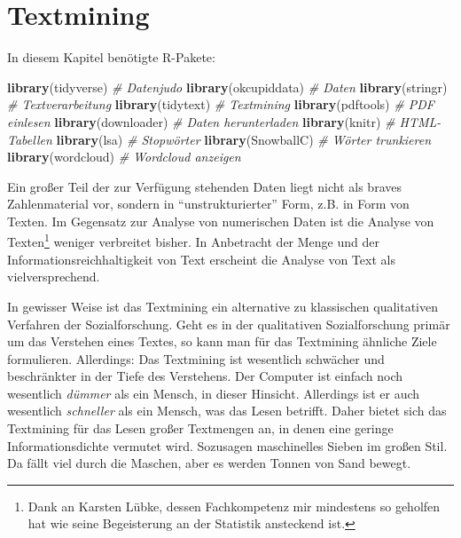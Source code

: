 \documentclass[12pt,]{book}
\newenvironment{Shaded}{\begin{snugshade}}{\end{snugshade}}
\newcommand{\KeywordTok}[1]{\textcolor[rgb]{0.13,0.29,0.53}{\textbf{{#1}}}}
\newcommand{\CommentTok}[1]{\textcolor[rgb]{0.56,0.35,0.01}{\textit{{#1}}}}
\newcommand{\NormalTok}[1]{{#1}}
\let\rmarkdownfootnote\footnote%
\def\footnote{\protect\rmarkdownfootnote}
\begin{document}
\chapter{Textmining}\label{textmining}

In diesem Kapitel benötigte R-Pakete:

\begin{Shaded}
\begin{Highlighting}[]
\KeywordTok{library}\NormalTok{(tidyverse)  }\CommentTok{# Datenjudo}
\KeywordTok{library}\NormalTok{(okcupiddata)  }\CommentTok{# Daten}
\KeywordTok{library}\NormalTok{(stringr)  }\CommentTok{# Textverarbeitung}
\KeywordTok{library}\NormalTok{(tidytext)  }\CommentTok{# Textmining}
\KeywordTok{library}\NormalTok{(pdftools)  }\CommentTok{# PDF einlesen}
\KeywordTok{library}\NormalTok{(downloader)  }\CommentTok{# Daten herunterladen}
\KeywordTok{library}\NormalTok{(knitr)  }\CommentTok{# HTML-Tabellen}
\KeywordTok{library}\NormalTok{(lsa)  }\CommentTok{# Stopwörter }
\KeywordTok{library}\NormalTok{(SnowballC)  }\CommentTok{# Wörter trunkieren}
\KeywordTok{library}\NormalTok{(wordcloud)  }\CommentTok{# Wordcloud anzeigen}
\end{Highlighting}
\end{Shaded}

Ein großer Teil der zur Verfügung stehenden Daten liegt nicht als braves
Zahlenmaterial vor, sondern in ``unstrukturierter'' Form, z.B. in Form
von Texten. Im Gegensatz zur Analyse von numerischen Daten ist die
Analyse von Texten\footnote{Dank an Karsten Lübke, dessen Fachkompetenz
  mir mindestens so geholfen hat wie seine Begeisterung an der Statistik
  ansteckend ist.} weniger verbreitet bisher. In Anbetracht der Menge
und der Informationsreichhaltigkeit von Text erscheint die Analyse von
Text als vielversprechend.

In gewisser Weise ist das Textmining ein alternative zu klassischen
qualitativen Verfahren der Sozialforschung. Geht es in der qualitativen
Sozialforschung primär um das Verstehen eines Textes, so kann man für
das Textmining ähnliche Ziele formulieren. Allerdings: Das Textmining
ist wesentlich schwächer und beschränkter in der Tiefe des Verstehens.
Der Computer ist einfach noch wesentlich \emph{dümmer} als ein Mensch,
in dieser Hinsicht. Allerdings ist er auch wesentlich \emph{schneller}
als ein Mensch, was das Lesen betrifft. Daher bietet sich das Textmining
für das Lesen großer Textmengen an, in denen eine geringe
Informationsdichte vermutet wird. Sozusagen maschinelles Sieben im
großen Stil. Da fällt viel durch die Maschen, aber es werden Tonnen von
Sand bewegt.
\end{document}
